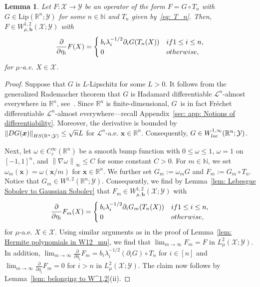 \documentclass[namedate,webpdf]{ima-authoring-template-blank}
\newcommand*{\Lip}{\mathrm{Lip}}  %
\newcommand*{\HS}{\textup{HS}}
\newcommand*{\nm}[1]{{\left\|#1\right \|}}
\newcounter{counter}
\numberwithin{counter}{section}
\numberwithin{equation}{section}
\theoremstyle{plain}
\newtheorem{lemma}[counter]{Lemma}
\theoremstyle{definition}
\newcommand*{\cL}{\mathcal{L}}
\newcommand*{\cX}{\mathcal{X}}
\newcommand*{\cY}{\mathcal{Y}}
\newcommand*{\bbN}{\mathbb{N}}
\newcommand*{\bbR}{\mathbb{R}}
\theoremstyle{thmstyletwo}
\begin{document}
\begin{lemma}
\label{lem: Lipschitz to Gaussian Sobolev}
    Let \(F : \cX \to \cY\) be an operator of the form
    \(
    F = G \circ T_n
    \)
    with \(G \in \Lip(\bbR^n; \cY)\) for some \(n \in \bbN\) and \( T_n \) given by~\eqref{eq: T_n}.
    Then, \(F \in W_{\mu, \bm{b}}^{1,2}(\cX; \cY)\) with
    \[
    \frac{\partial}{\partial \eta_i} F(X) =
    \begin{cases}
        b_i \lambda_i^{-1/2} \partial_i G(T_n(X)) & \textup{ if } 1 \leq i \leq n, \\
        0 & \textup{ otherwise},
    \end{cases}
    \]
    for \(\mu\)-a.e. \(X \in \cX\).
\end{lemma}

\begin{proof}
    Suppose that \( G \) is \( L \)-Lipschitz for some \( L > 0 \). It follows from the generalized Rademacher theorem that \( G \) is Hadamard differentiable \(\cL^n\)-almost everywhere in \(\bbR^n\), see~\mbox{\citet[Thm. 1 in Ch. 2 \& Rmk. 2 in Ch. 1]{aronszajn_DifferentiabilityLipschitzianMappingsBanach_1976}}. Since \(\bbR^n\) is finite-dimensional, \(G\)~is in fact Fréchet differentiable \(\cL^n\)-almost everywhere---recall Appendix~\ref{sec: app: Notions of differentiability}. Moreover, the derivative is bounded by \( \nm{D G(\bm{x})}_{\HS(\bbR^n; \cY)} \leq \sqrt{n} L \) for \( \cL^{n} \)-a.e. \( \bm{x} \in \bbR^n \). Consequently, \( G \in W^{1, \infty}_{\textup{loc}}(\bbR^n; \cY) \).
    
    Next, let \( \omega \in C_c^{\infty}(\bbR^n) \) be a smooth bump function with \( 0 \leq \omega \leq 1 \), \( \omega = 1 \) on \( [-1,1]^n \), and \( \nm{\nabla \omega}_{\infty} \leq C \) for some constant \( C > 0 \). For \( m \in \bbN \), we set \( \omega_m(\bm{x}) = \omega(\bm{x} / m) \) for \( \bm{x} \in \bbR^n \). We further set \(G_m := \omega_m G\) and \( F_m := G_m \circ T_n \). Notice that \( G_m \in W^{1,2}(\bbR^n; \cY) \). Consequently, we find by Lemma~\ref{lem: Lebesgue Sobolev to Gaussian Sobolev} that \( F_m \in W^{1,2}_{\mu, \bm{b}}(\cX; \cY) \) with 
    \[
    \frac{\partial}{\partial \eta_i} F_m(X) =
    \begin{cases}
        b_i \lambda_i^{-1/2} \partial_i G_m(T_n(X)) & \textup{ if } 1 \leq i \leq n, \\
        0 & \textup{ otherwise,}
    \end{cases}
    \]
    for \( \mu \)-a.e. \( X \in \cX \). Using similar arguments as in the proof of Lemma~\ref{lem: Hermite polynomials in W12_mu}, we find that \( \lim_{m \to \infty} F_m = F \) in \( L^2_{\mu}(\cX; \cY) \). In addition, \( \lim_{m \to \infty} \frac{\partial}{\partial \eta_i} F_m = b_i \lambda_i^{-1/2} (\partial_i G) \circ T_n \) for \(i \in [n]\) and \( \lim_{m \to \infty} \frac{\partial}{\partial \eta_i} F_m = 0\) for \( i > n\) in \( L^2_{\mu}(\cX; \cY) \). The claim now follows by Lemma~\ref{lem: belonging to W^1,2}(ii).
\end{proof}
\end{document}
